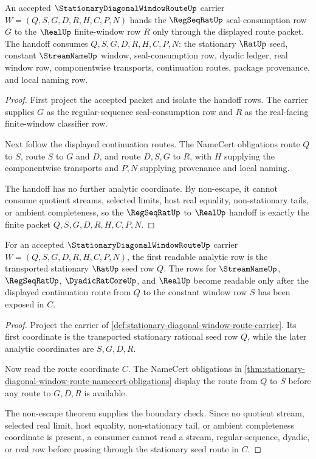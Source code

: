 \begin{theorem}
\label{thm:stationary-diagonal-window-route-seal-consumption-handoff}
An accepted $\StationaryDiagonalWindowRouteUp$ carrier $W=(Q,S,G,D,R,H,C,P,N)$ hands the $\RegSeqRatUp$ seal-consumption row $G$ to the $\RealUp$ finite-window row $R$ only through the displayed route packet. The handoff consumes $Q,S,G,D,R,H,C,P,N$: the stationary $\RatUp$ seed, constant $\StreamNameUp$ window, seal-consumption row, dyadic ledger, real window row, componentwise transports, continuation routes, package provenance, and local naming row.
\end{theorem}
\begin{proof}
First project the accepted packet and isolate the handoff rows. The carrier supplies $G$ as the regular-sequence seal-consumption row and $R$ as the real-facing finite-window classifier row.

Next follow the displayed continuation routes. The NameCert obligations route $Q$ to $S$, route $S$ to $G$ and $D$, and route $D,S,G$ to $R$, with $H$ supplying the componentwise transports and $P,N$ supplying provenance and local naming.

The handoff has no further analytic coordinate. By non-escape, it cannot consume quotient streams, selected limits, host real equality, non-stationary tails, or ambient completeness, so the $\RegSeqRatUp$ to $\RealUp$ handoff is exactly the finite packet $Q,S,G,D,R,H,C,P,N$.
\end{proof}

\begin{theorem}
\label{thm:stationary-diagonal-window-route-stationary-seed-exposure}
For an accepted $\StationaryDiagonalWindowRouteUp$ carrier $W=(Q,S,G,D,R,H,C,P,N)$, the first readable analytic row is the transported stationary $\RatUp$ seed row $Q$. The rows for $\StreamNameUp$, $\RegSeqRatUp$, $\DyadicRatCoreUp$, and $\RealUp$ become readable only after the displayed continuation route from $Q$ to the constant window row $S$ has been exposed in $C$.
\end{theorem}
\begin{proof}
Project the carrier of \autoref{def:stationary-diagonal-window-route-carrier}. Its first coordinate is the transported stationary rational seed row $Q$, while the later analytic coordinates are $S,G,D,R$.

Now read the route coordinate $C$. The NameCert obligations in \autoref{thm:stationary-diagonal-window-route-namecert-obligations} display the route from $Q$ to $S$ before any route to $G,D,R$ is available.

The non-escape theorem supplies the boundary check. Since no quotient stream, selected real limit, host equality, non-stationary tail, or ambient completeness coordinate is present, a consumer cannot read a stream, regular-sequence, dyadic, or real row before passing through the stationary seed route in $C$.
\end{proof}

